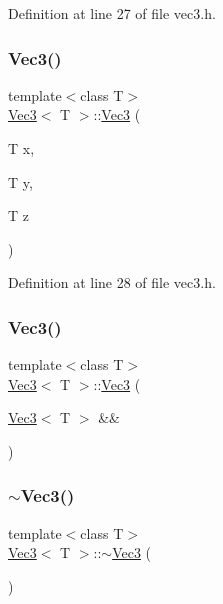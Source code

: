 Definition at line 27 of file vec3.\+h.

\mbox{\label{class_vec3_addc6700c00ab4cf8b6e872e5fab59020}} 
\subsubsection{\texorpdfstring{Vec3()}{Vec3()}\hspace{0.1cm}{\footnotesize\ttfamily [2/4]}}
{\footnotesize\ttfamily template$<$class T$>$ \\
\mbox{\hyperlink{class_vec3}{Vec3}}$<$ T $>$\+::\mbox{\hyperlink{class_vec3}{Vec3}} (\begin{DoxyParamCaption}\item[{T}]{x,  }\item[{T}]{y,  }\item[{T}]{z }\end{DoxyParamCaption})\hspace{0.3cm}{\ttfamily [inline]}}



Definition at line 28 of file vec3.\+h.

\mbox{\label{class_vec3_acd2c273ce3703fd2a00ba8ed9e0cdaf7}} 
\subsubsection{\texorpdfstring{Vec3()}{Vec3()}\hspace{0.1cm}{\footnotesize\ttfamily [3/4]}}
{\footnotesize\ttfamily template$<$class T$>$ \\
\mbox{\hyperlink{class_vec3}{Vec3}}$<$ T $>$\+::\mbox{\hyperlink{class_vec3}{Vec3}} (\begin{DoxyParamCaption}\item[{\mbox{\hyperlink{class_vec3}{Vec3}}$<$ T $>$ \&\&}]{ }\end{DoxyParamCaption})\hspace{0.3cm}{\ttfamily [default]}}

\mbox{\label{class_vec3_a9283d297ddf47fb465cd95645615582a}} 
\subsubsection{\texorpdfstring{$\sim$Vec3()}{~Vec3()}}
{\footnotesize\ttfamily template$<$class T$>$ \\
\mbox{\hyperlink{class_vec3}{Vec3}}$<$ T $>$\+::$\sim$\mbox{\hyperlink{class_vec3}{Vec3}} (\begin{DoxyParamCaption}{ }\end{DoxyParamCaption})\hspace{0.3cm}{\ttfamily [inline]}}




